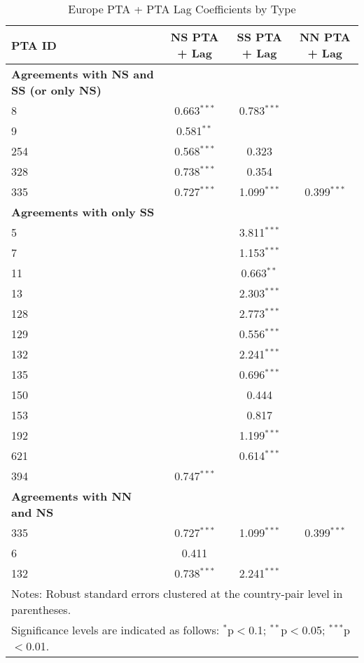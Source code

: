 \begin{table}[htbp]
    \centering
    \caption{Europe PTA + PTA Lag Coefficients by Type}
    \label{tab:europe_pta}
    \begin{adjustbox}{max width=\textwidth}
    \begin{tabular}{lccc}
    \hline
    \textbf{PTA ID} & \textbf{NS PTA + Lag} & \textbf{SS PTA + Lag} & \textbf{NN PTA + Lag} \\
    \hline
    \textbf{Agreements with NS and SS (or only NS)} &  &  &  \\
    \hline
    8   & 0.663$^{\ast\ast\ast}$ & 0.783$^{\ast\ast\ast}$ &  \\
    9   & 0.581$^{\ast\ast}$ &  &  \\
    254 & 0.568$^{\ast\ast\ast}$ & 0.323 &  \\
    328 & 0.738$^{\ast\ast\ast}$ & 0.354 &  \\
    335 & 0.727$^{\ast\ast\ast}$ & 1.099$^{\ast\ast\ast}$ & 0.399$^{\ast\ast\ast}$ \\
    \hline
    \textbf{Agreements with only SS} &  &  &  \\
    \hline
    5   &  & 3.811$^{\ast\ast\ast}$ &  \\
    7   &  & 1.153$^{\ast\ast\ast}$ &  \\
    11  &  & 0.663$^{\ast\ast}$ &  \\
    13  &  & 2.303$^{\ast\ast\ast}$ &  \\
    128 &  & 2.773$^{\ast\ast\ast}$ &  \\
    129 &  & 0.556$^{\ast\ast\ast}$ &  \\
    132 &  & 2.241$^{\ast\ast\ast}$ &  \\
    135 &  & 0.696$^{\ast\ast\ast}$ &  \\
    150 &  & 0.444 &  \\
    153 &  & 0.817 &  \\
    192 &  & 1.199$^{\ast\ast\ast}$ &  \\
    621 &  & 0.614$^{\ast\ast\ast}$ &  \\
    394 & 0.747$^{\ast\ast\ast}$ &  &  \\
    \hline
    \textbf{Agreements with NN and NS} &  &  &  \\
    \hline
    335 & 0.727$^{\ast\ast\ast}$ & 1.099$^{\ast\ast\ast}$ & 0.399$^{\ast\ast\ast}$ \\
    6   & 0.411 &  &  \\
    132 & 0.738$^{\ast\ast\ast}$ & 2.241$^{\ast\ast\ast}$ &  \\
    \hline
    \multicolumn{4}{l}{\footnotesize{Notes: Robust standard errors clustered at the country-pair level in parentheses.}} \\
    \multicolumn{4}{l}{\footnotesize{Significance levels are indicated as follows: $^{\ast}$p$<$0.1; $^{\ast\ast}$p$<$0.05; $^{\ast\ast\ast}$p$<$0.01.}} \\
    \end{tabular}
    \end{adjustbox}
\end{table}
